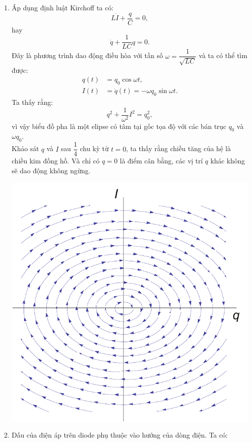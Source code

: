 \begin{loigiai}\[\]
    \begin{enumerate}[1)]
        \item Áp dụng định luật Kirchoff ta có:
        \[L\Dot{I}+\dfrac{q}{C}=0,\]
        hay
        \[\ddot{q}+\dfrac{1}{LC}q=0.\]
        Đây là phương trình dao động điều hòa với tần số $\omega=\dfrac{1}{\sqrt{LC}}$ và ta có thể tìm được:
        \begin{align*}
            q(t) &= q_0\cos{\omega t},\\
            I(t) &= \Dot{q}(t)=-\omega q_0 \sin{\omega t}.
        \end{align*}
        Ta thấy rằng:
        \[q^2+\dfrac{1}{\omega^2}I^2=q_0^2,\]
        vì vậy biểu đồ pha là một elipse có tâm tại gốc tọa độ với các bán trục $q_0$ và $\omega q_0$.\\
        Khảo sát $q$ và $I$ sau $\dfrac{1}{4}$ chu kỳ từ $t=0$, ta thấy rằng chiều tăng của hệ là chiều kim đồng hồ. Và chỉ có $q=0$ là điểm cân bằng, các vị trí $q$ khác không sẽ dao động không ngừng.
        \begin{center}
            \includegraphics[scale=0.75]{Anh/Trung2.pdf}
        \end{center}
        \item Dấu của điện áp trên diode phụ thuộc vào hướng của dòng điện. Ta có: 

\end{enumerate}
\end{loigiai}

